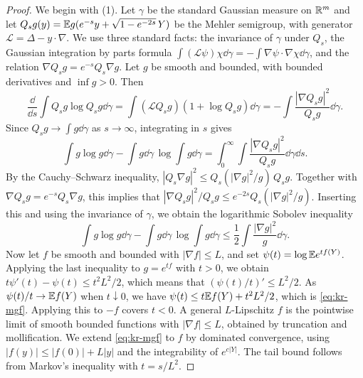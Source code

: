 \begin{proof}
We begin with (1). Let $\gamma$ be the standard Gaussian measure on $\mathbb R^m$ and let $Q_sg(y)=\mathbb E g(e^{-s}y+\sqrt{1-e^{-2s}}\,Y)$ be the Mehler semigroup, with generator $\mathcal L=\Delta-y\cdot\nabla$. We use three standard facts: the invariance of $\gamma$ under $Q_s$, the Gaussian integration by parts formula $\int(\mathcal L\psi)\chi\dd\gamma=-\int\nabla\psi\cdot\nabla\chi\dd\gamma$, and the relation $\nabla Q_sg=e^{-s}Q_s\nabla g$. Let $g$ be smooth and bounded, with bounded derivatives and $\inf g>0$. Then
\[
\frac{\dd}{\dd s}\int Q_sg\log Q_sg\dd\gamma=\int(\mathcal LQ_sg)(1+\log Q_sg)\dd\gamma=-\int\frac{|\nabla Q_sg|^2}{Q_sg}\dd\gamma.
\]
Since $Q_sg\to\int g\dd\gamma$ as $s\to\infty$, integrating in $s$ gives
\[
\int g\log g\dd\gamma-\int g\dd\gamma\,\log\int g\dd\gamma=\int_0^\infty\int\frac{|\nabla Q_sg|^2}{Q_sg}\dd\gamma\dd s.
\]
By the Cauchy--Schwarz inequality, $|Q_s\nabla g|^2\le Q_s(|\nabla g|^2/g)\,Q_sg$. Together with $\nabla Q_sg=e^{-s}Q_s\nabla g$, this implies that $|\nabla Q_sg|^2/Q_sg\le e^{-2s}Q_s(|\nabla g|^2/g)$. Inserting this and using the invariance of $\gamma$, we obtain the logarithmic Sobolev inequality
\[
\int g\log g\dd\gamma-\int g\dd\gamma\,\log\int g\dd\gamma\le\frac12\int\frac{|\nabla g|^2}g\dd\gamma.
\]
Now let $f$ be smooth and bounded with $|\nabla f|\le L$, and set $\psi(t)=\log\mathbb E e^{tf(Y)}$. Applying the last inequality to $g=e^{tf}$ with $t>0$, we obtain $t\psi'(t)-\psi(t)\le t^2L^2/2$, which means that $(\psi(t)/t)'\le L^2/2$. As $\psi(t)/t\to\mathbb E f(Y)$ when $t\downarrow0$, we have $\psi(t)\le t\mathbb E f(Y)+t^2L^2/2$, which is \eqref{eq:kr-mgf}. Applying this to $-f$ covers $t<0$. A general $L$-Lipschitz $f$ is the pointwise limit of smooth bounded functions with $|\nabla f|\le L$, obtained by truncation and mollification. We extend \eqref{eq:kr-mgf} to $f$ by dominated convergence, using $|f(y)|\le|f(0)|+L|y|$ and the integrability of $e^{c|Y|}$. The tail bound follows from Markov's inequality with $t=s/L^2$.


\end{proof}
